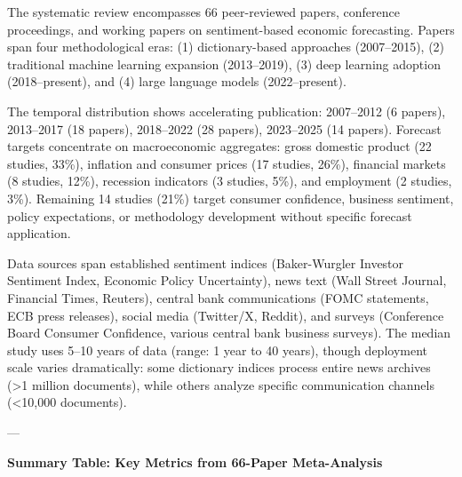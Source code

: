 \documentclass[11pt]{article}
\begin{document}
The systematic review encompasses 66 peer-reviewed papers, conference proceedings, and working papers on sentiment-based economic forecasting. Papers span four methodological eras: (1) dictionary-based approaches (2007--2015), (2) traditional machine learning expansion (2013--2019), (3) deep learning adoption (2018--present), and (4) large language models (2022--present). 

The temporal distribution shows accelerating publication: 2007--2012 (6 papers), 2013--2017 (18 papers), 2018--2022 (28 papers), 2023--2025 (14 papers). Forecast targets concentrate on macroeconomic aggregates: gross domestic product (22 studies, 33\%), inflation and consumer prices (17 studies, 26\%), financial markets (8 studies, 12\%), recession indicators (3 studies, 5\%), and employment (2 studies, 3\%). Remaining 14 studies (21\%) target consumer confidence, business sentiment, policy expectations, or methodology development without specific forecast application.

Data sources span established sentiment indices (Baker-Wurgler Investor Sentiment Index, Economic Policy Uncertainty), news text (Wall Street Journal, Financial Times, Reuters), central bank communications (FOMC statements, ECB press releases), social media (Twitter/X, Reddit), and surveys (Conference Board Consumer Confidence, various central bank business surveys). The median study uses 5--10 years of data (range: 1 year to 40 years), though deployment scale varies dramatically: some dictionary indices process entire news archives (>1 million documents), while others analyze specific communication channels (<10,000 documents).

---

\noindent\textbf{Summary Table: Key Metrics from 66-Paper Meta-Analysis}
\end{document}
